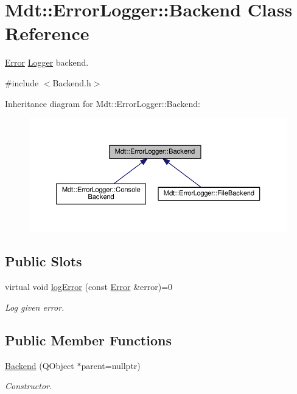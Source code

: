 \hypertarget{class_mdt_1_1_error_logger_1_1_backend}{}\section{Mdt\+:\+:Error\+Logger\+:\+:Backend Class Reference}
\label{class_mdt_1_1_error_logger_1_1_backend}


\hyperlink{class_mdt_1_1_error}{Error} \hyperlink{class_mdt_1_1_error_logger_1_1_logger}{Logger} backend.  




{\ttfamily \#include $<$Backend.\+h$>$}



Inheritance diagram for Mdt\+:\+:Error\+Logger\+:\+:Backend\+:\nopagebreak
\begin{figure}[H]
\begin{center}
\leavevmode
\includegraphics[width=350pt]{class_mdt_1_1_error_logger_1_1_backend__inherit__graph}
\end{center}
\end{figure}
\subsection*{Public Slots}
\begin{DoxyCompactItemize}
\item 
virtual void \hyperlink{class_mdt_1_1_error_logger_1_1_backend_acf37cfc576269934ca8ce04e3601058d}{log\+Error} (const \hyperlink{class_mdt_1_1_error}{Error} \&error)=0
\begin{DoxyCompactList}\small\item\em Log given error. \end{DoxyCompactList}\end{DoxyCompactItemize}
\subsection*{Public Member Functions}
\begin{DoxyCompactItemize}
\item 
\hyperlink{class_mdt_1_1_error_logger_1_1_backend_ad0e3d73ad0c0248f2d62e00f5180ca1e}{Backend} (Q\+Object $\ast$parent=nullptr)\hypertarget{class_mdt_1_1_error_logger_1_1_backend_ad0e3d73ad0c0248f2d62e00f5180ca1e}{}\label{class_mdt_1_1_error_logger_1_1_backend_ad0e3d73ad0c0248f2d62e00f5180ca1e}

\begin{DoxyCompactList}\small\item\em Constructor. \end{DoxyCompactList}\end{DoxyCompactItemize}


